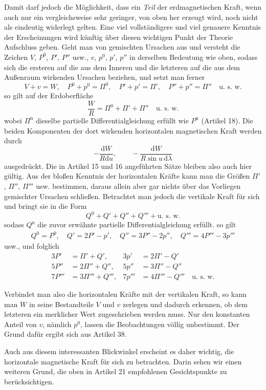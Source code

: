 Damit darf jedoch die Möglichkeit, dass ein \textit{Teil} der erdmagnetischen Kraft, wenn auch nur ein vergleichsweise sehr geringer, von oben her erzeugt wird, noch nicht als eindeutig widerlegt gelten. Eine viel vollständigere und viel genauere Kenntnis der Erscheinungen wird künftig über diesen wichtigen Punkt der Theorie Aufschluss geben. Geht man von gemischten Ursachen aus und versteht die Zeichen $V$, $P^0$, $P'$, $P''$ usw., $v$, $p^0$, $p'$, $p''$ in derselben Bedeutung wie oben, sodass sich die ersteren auf die aus dem Inneren und die letzteren auf die aus dem Außenraum wirkenden Ursachen beziehen, und setzt man ferner
\[
V+v=W,\quad P^0+p^0=\Pi^0,\quad P'+p'=\Pi',\quad P''+p''=\Pi''\quad\text{u. s. w.}
\]
so gilt auf der Erdoberfläche
\[
\frac WR=\Pi^0+\Pi'+\Pi''\quad\text{u. s. w.}
\]
wobei $\Pi^{\mathrm n}$ dieselbe partielle Differentialgleichung erfüllt wie $P^{\mathrm n}$ (Artikel 18). Die beiden Komponenten der dort wirkenden horizontalen magnetischen Kraft werden durch
\[
-\frac{\mathrm dW}{R\mathrm du},\qquad-\frac{\mathrm dW}{R\sin u\,\mathrm d\lambda}
\]
ausgedrückt. Die in Artikel 15 und 16 angeführten Sätze bleiben also auch hier gültig. Aus der bloßen Kenntnis der horizontalen Kräfte kann man die Größen $\Pi'$, $\Pi''$, $\Pi'''$ usw. bestimmen, daraus allein aber gar nichts über das Vorliegen gemischter Ursachen schließen. Betrachtet man jedoch die vertikale Kraft für sich und bringt sie in die Form
\[
Q^0+Q'+Q''+Q'''+\text{u. s. w.}
\]
sodass $Q^{\mathrm n}$ die zuvor erwähnte partielle Differentialgleichung erfüllt. so gilt
\[
\begin{gathered}
Q^0=P^0,\quad Q'=2P'-p',\quad Q''=3P''-2p'',\quad Q'''=4P'''-3p'''
\end{gathered}
\]
usw., und folglich
\[
\begin{aligned}
3P'&=\Pi'+Q',&3p'&=2\Pi'-Q'\\
5P''&=2\Pi''+Q'',&5p''&=3\Pi''-Q''\\
7P'''&=3\Pi'''+Q''',&7p'''&=4\Pi'''-Q'''\quad\text{u. s. w.}
\end{aligned}
\]

Verbindet man also die horizontalen Kräfte mit der vertikalen Kraft, so kann man $W$ in seine Bestandteile $V$ und $v$ zerlegen und dadurch erkennen, ob dem letzteren ein merklicher Wert zugeschrieben werden muss. Nur den konstanten Anteil von $v$, nämlich $p^0$, lassen die Beobachtungen völlig unbestimmt. Der Grund dafür ergibt sich aus Artikel 38.

Auch aus diesem interessanten Blickwinkel erscheint es daher wichtig, die horizontale magnetische Kraft für sich zu betrachten. Darin sehen wir einen weiteren Grund, die oben in Artikel 21 empfohlenen Gesichtspunkte zu berücksichtigen.

